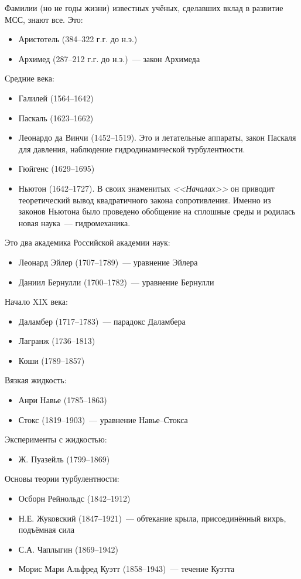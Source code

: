 Фамилии (но не годы жизни) известных учёных, сделавших вклад в развитие МСС, знают все. Это:
\begin{itemize}
	\setlength\itemsep{-0.4em}
	\item Аристотель (384--322 г.г. до н.э.)
	\item Архимед (287--212 г.г. до н.э.)~--- закон Архимеда
\end{itemize}
	Средние века:
\begin{itemize}
	\setlength\itemsep{-0.4em}
	\item Галилей (1564--1642)
	\item Паскаль (1623--1662)
	\item Леонардо да Винчи (1452--1519).
	Это и летательные аппараты, закон Паскаля для давления, наблюдение гидродинамической турбулентности.
	\item Гюйгенс (1629--1695)
	\item Ньютон (1642--1727). В своих знаменитых \emph{<<Началах>>} он приводит теоретический вывод квадратичного закона сопротивления. Именно из законов Ньютона было проведено обобщение на сплошные среды и родилась новая наука~--- гидромеханика.
\end{itemize}
Это два академика Российской академии наук:
\begin{itemize}
	\setlength\itemsep{-0.4em}
	\item Леонард Эйлер (1707--1789)~--- уравнение Эйлера
	\item Даниил Бернулли (1700--1782)~---  уравнение Бернулли
\end{itemize}
Начало XIX века:
\begin{itemize}
	\setlength\itemsep{-0.4em}
	\item Даламбер (1717--1783)~--- парадокс Даламбера
	\item Лагранж (1736--1813)
	\item Коши (1789--1857)
\end{itemize}
Вязкая жидкость:
\begin{itemize}
	\setlength\itemsep{-0.4em}
	\item Анри Навье  (1785--1863)
	\item Стокс (1819--1903)~--- уравнение Навье--Стокса
\end{itemize}
Эксперименты с жидкостью:
\begin{itemize}
	\setlength\itemsep{-0.4em}
	\item Ж. Пуазейль (1799--1869)
\end{itemize}
Основы теории турбулентности:
\begin{itemize}
	\setlength\itemsep{-0.4em}
	\item Осборн Рейнольдс (1842--1912)
	\item Н.Е. Жуковский (1847--1921)~--- обтекание крыла, присоединённый вихрь, подъёмная сила
	\item С.А. Чаплыгин (1869--1942)
	\item Морис Мари Альфред Куэтт  (1858--1943)~--- течение Куэтта
\end{itemize}
